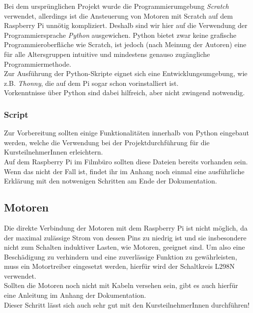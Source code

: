 Bei dem ursprünglichen Projekt wurde die Programmierumgebung \emph{Scratch} verwendet, allerdings ist die Ansteuerung von Motoren mit Scratch auf dem Raspberry Pi  unnötig kompliziert. Deshalb sind wir hier auf die Verwendung der Programmiersprache \emph{Python} ausgewichen. Python bietet zwar keine grafische Programmieroberfläche wie Scratch, ist jedoch (nach Meinung der Autoren) eine für alle Altersgruppen intuitive und mindestens genauso zugängliche Programmiermethode.\\

Zur Ausführung der Python-Skripte eignet sich eine Entwicklungsumgebung, wie z.B. \emph{Thonny}, die auf dem Pi sogar schon vorinstalliert ist.\\
Vorkenntnisse über Python sind dabei hilfreich, aber nicht zwingend notwendig.

\subsubsection{Script}
Zur Vorbereitung sollten einige Funktionalitäten innerhalb von Python eingebaut werden, welche die Verwendung bei der Projektdurchführung für die KursteilnehmerInnen erleichtern.\\
Auf dem Raspberry Pi im Filmbüro sollten diese Dateien bereits vorhanden sein. Wenn das nicht der Fall ist, findet ihr im Anhang noch einmal eine ausführliche Erklärung mit den notwenigen Schritten am Ende der Dokumentation.\\


\subsection{Motoren}
Die direkte Verbindung der Motoren mit dem Raspberry Pi ist nicht möglich, da der maximal zulässige Strom von dessen Pins zu niedrig ist und sie insbesondere nicht zum Schalten induktiver Lasten, wie Motoren, geeignet sind. Um also eine Beschädigung zu verhindern und eine zuverlässige Funktion zu gewährleisten, muss ein Motortreiber eingesetzt werden, hierfür wird der Schaltkreis L298N verwendet.\\


Sollten die Motoren noch nicht mit Kabeln versehen sein, gibt es auch hierfür eine Anleitung im Anhang der Dokumentation.\\
Dieser Schritt lässt sich auch sehr gut mit den KursteilnehmerInnen durchführen!

